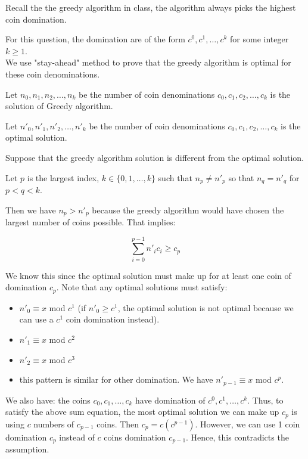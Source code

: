 \documentclass{cpsc413Solutions}
\begin{document}


\begin{problemlist}
\begin{problem}
\begin{answer}
Recall the the greedy algorithm in class, the algorithm always picks the highest coin domination.

For this question, the domination are of the form $c^0, c^1, \dots, c^k$ for some integer $k \geq 1$.\\
We use "stay-ahead" method to prove that the greedy algorithm is optimal for these coin denominations.

Let $n_0, n_1, n_2, \dots, n_k$ be the number of coin denominations $c_0, c_1, c_2, \dots, c_k$ is the solution of Greedy algorithm.

Let $n'_0, n'_1, n'_2, \dots, n'_k$ be the number of coin denominations $c_0, c_1, c_2, \dots, c_k$ is the optimal solution.

Suppose that the greedy algorithm solution is different from the optimal solution.

Let $p$ is the largest index, $k \in \{0,1,\dots, k\}$ such that $n_p \neq n'_p$ so that $n_q = n'_q$ for $p<q<k$.

Then we have $n_p > n'_p$ because the greedy algorithm would have chosen the largest number of coins possible. That implies:

\begin{equation*}
    \sum_{i=0}^{p-1}n'_ic_i \geq c_p
\end{equation*}

We know this since the optimal solution must make up for at least one coin of domination $c_p$. Note that any optimal solutions must satisfy:
\begin{itemize}
    \item $n'_0 \equiv x$ mod $c^1$ (if $n'_0 \geq c^1$, the optimal solution is not optimal because we can use a $c^1$ coin domination instead).
    \item $n'_1 \equiv x$ mod $c^2$
    \item $n'_2 \equiv x$ mod $c^3$
    \item this pattern is similar for other domination. We have $n'_{p-1} \equiv x$ mod $c^p$.
\end{itemize}

We also have: the coins $c_0, c_1, \dots, c_k$ have domination of $c^0, c^1, \dots, c^k$. 
Thus, to satisfy the above sum equation, the most optimal solution we can make up $c_p$ is using $c$ numbers of $c_{p-1}$ coins. Then $c_p = c(c^{p-1})$. However, we can use 1 coin domination $c_p$ instead of $c$ coins domination $c_{p-1}$. Hence, this contradicts the assumption.


\end{answer}
\end{problem}
\end{problemlist}
\end{document}
